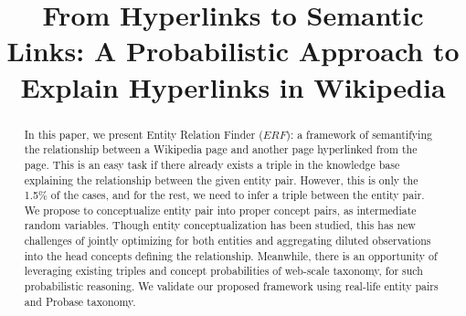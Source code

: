 \documentclass[letterpaper]{article}
\begin{document}
\title{From Hyperlinks to Semantic Links: A Probabilistic Approach to Explain Hyperlinks in Wikipedia}




\maketitle
\begin{abstract}

In this paper, we present Entity Relation Finder ($ERF$): a framework of semantifying 
the relationship between a Wikipedia page and another page hyperlinked from the page.
This is an easy task if there already exists a triple in the knowledge base explaining the relationship
between the given entity pair.
However, this is only the 1.5\% of the cases, and for the rest, we need to infer a triple between the entity pair.
We propose to conceptualize entity pair into proper concept pairs, as intermediate random variables.
Though entity conceptualization has been studied, this has new challenges of jointly optimizing for both entities and aggregating diluted observations into the head concepts defining the relationship.
Meanwhile, there is an opportunity of leveraging existing triples and concept probabilities of web-scale taxonomy, for such probabilistic reasoning.
We validate our proposed framework using real-life entity pairs and Probase taxonomy.

\end{abstract}








%


\newpage	

\small

%

\end{document}
